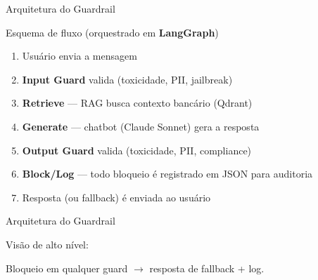 \documentclass[aspectratio=169,11pt]{beamer}
\begin{document}
\begin{frame}{Arquitetura do Guardrail}
  \begin{center}Esquema de fluxo (orquestrado em \textbf{LangGraph})\end{center}
  \vspace{0.4em}
  \begin{enumerate}
    \item Usuário envia a mensagem
    \item \textbf{Input Guard} valida (toxicidade, PII, jailbreak)
    \item \textbf{Retrieve} --- RAG busca contexto bancário (Qdrant)
    \item \textbf{Generate} --- chatbot (Claude Sonnet) gera a resposta
    \item \textbf{Output Guard} valida (toxicidade, PII, compliance)
    \item \textbf{Block/Log} --- todo bloqueio é registrado em JSON para auditoria
    \item Resposta (ou fallback) é enviada ao usuário
  \end{enumerate}
\end{frame}

\begin{frame}{Arquitetura do Guardrail}
  \begin{center}Visão de alto nível:\end{center}
  \vspace{0.5em}
  \begin{center}
  \end{center}
  \vspace{0.5em}
  \begin{center}\small Bloqueio em qualquer guard $\rightarrow$ resposta de fallback + log.\end{center}
\end{frame}
\end{document}
